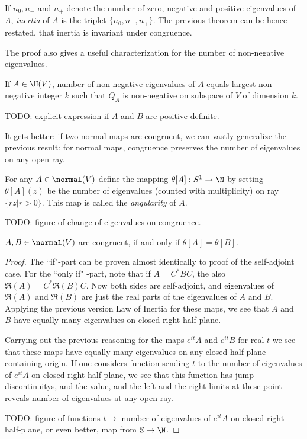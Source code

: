 If $n_{0}, n_{-}$ and $n_{+}$ denote the number of zero, negative and positive eigenvalues of $A$, \textit{inertia} of $A$ is the triplet $\{n_{0}, n_{-}, n_{+} \}$. The previous theorem can be hence restated, that inertia is invariant under congruence.

The proof also gives a useful characterization for the number of non-negative eigenvalues.

\begin{kor}
	If $A \in \H(V)$, number of non-negative eigenvalues of $A$ equals largest non-negative integer $k$ such that $Q_{A}$ is non-negative on subspace of $V$ of dimension $k$.
\end{kor}

TODO: explicit expression if $A$ and $B$ are positive definite.

It gets better: if two normal maps are congruent, we can vastly generalize the previous result: for normal maps, congruence preserves the number of eigenvalues on any open ray.

For any $A \in \normal(V)$ define the mapping $\theta[A] : S^{1} \to \N$ by setting $\theta[A](z)$ be the number of eigenvalues (counted with multiplicity) on ray $\{rz | r > 0\}$. This map is called the \textit{angularity} of $A$.

TODO: figure of change of eigenvalues on congruence.

\begin{lause}
	$A, B \in \normal(V)$ are congruent, if and only if $\theta[A] = \theta[B]$.
\end{lause}
\begin{proof}
	The ``if"-part can be proven almost identically to proof of the self-adjoint case. For the ``only if" -part, note that if $A = C^{*}BC$, the also $\Re(A) = C^{*}\Re(B)C$. Now both sides are self-adjoint, and eigenvalues of $\Re(A)$ and $\Re(B)$ are just the real parts of the eigenvalues of $A$ and $B$. Applying the previous version Law of Inertia for these maps, we see that $A$ and $B$ have equally many eigenvalues on closed right half-plane. 

	Carrying out the previous reasoning for the maps $e^{i t}A$ and $e^{i t} B$ for real $t$ we see that these maps have equally many eigenvalues on any closed half plane containing origin. If one considers function sending $t$ to the number of eigenvalues of $e^{i t} A$ on closed right half-plane, we see that this function has jump discontinuitys, and the value, and the left and the right limits at these point reveals number of eigenvalues at any open ray.

	TODO: figure of functions $t \mapsto$ number of eigenvalues of $e^{it}A$ on closed right half-plane, or even better, map from $\mathbb{S} \to \N$.
\end{proof}

